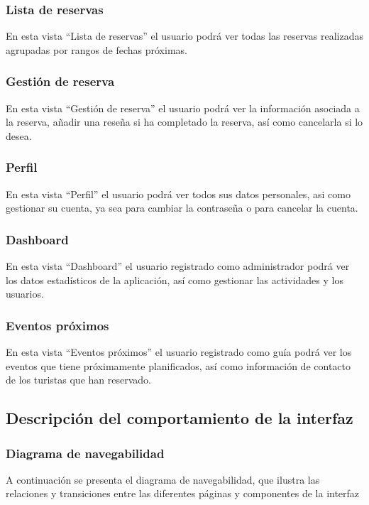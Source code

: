 \subsubsection{Lista de reservas}
En esta vista “Lista de reservas” el usuario podrá ver todas las reservas realizadas agrupadas por rangos de fechas próximas.

\subsubsection*{Gestión de reserva}
En esta vista “Gestión de reserva” el usuario podrá ver la información asociada a la reserva, añadir una reseña si ha completado la reserva, así como cancelarla si lo desea.

\subsubsection{Perfil}
En esta vista “Perfil” el usuario podrá ver todos sus datos personales, asi como gestionar su cuenta, ya sea para cambiar la contraseña o para cancelar la cuenta.

\subsubsection{Dashboard}
En esta vista “Dashboard” el usuario registrado como administrador podrá ver los datos estadísticos de la aplicación, así como gestionar las actividades y los usuarios.

\subsubsection{Eventos próximos}
En esta vista “Eventos próximos” el usuario registrado como guía podrá ver los eventos que tiene próximamente planificados, así como información de contacto de los turistas que han reservado.

\subsection{Descripción del comportamiento de la interfaz}
\subsubsection{Diagrama de navegabilidad}
A continuación se presenta el diagrama de navegabilidad, que ilustra las relaciones y transiciones entre las diferentes páginas y componentes de la interfaz

